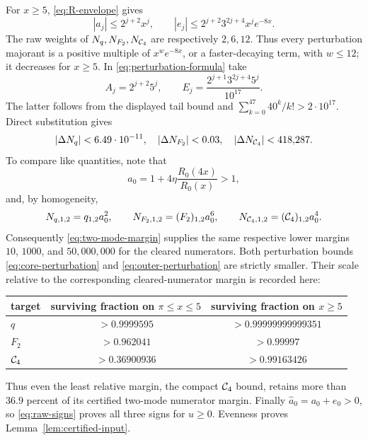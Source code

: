 For \(x\geq5\), \eqref{eq:R-envelope} gives
\[
 |a_j|\leq2^{j+2}x^j,\qquad
 |e_j|\leq2^{j+2}3^{2j+4}x^je^{-8x}.
\]
The raw weights of \(N_q,N_{F_2},N_{\mathcal{C}_4}\) are respectively \(2,6,12\).
Thus every perturbation majorant is a positive multiple of
\(x^we^{-8x}\), or a faster-decaying term, with \(w\leq12\); it decreases
for \(x\geq5\). In \eqref{eq:perturbation-formula} take
\[
 A_j=2^{j+2}5^j,\qquad
 E_j=\frac{2^{j+1}3^{2j+4}5^j}{10^{17}}.
\]
The latter follows from the displayed tail bound and
\(\sum_{k=0}^{47}40^k/k!>2\cdot10^{17}\). Direct substitution gives
\begin{equation}\label{eq:outer-perturbation}
 |\Delta N_q|<6.49\cdot10^{-11},\quad
 |\Delta N_{F_2}|<0.03,\quad
 |\Delta N_{\mathcal{C}_4}|<418{,}287.
\end{equation}
To compare like quantities, note that
\[
 a_0=1+4\eta\frac{R_0(4x)}{R_0(x)}>1,
\]
and, by homogeneity,
\[
 N_{q,1,2}=q_{1,2}a_0^2,\qquad
 N_{F_2,1,2}=(F_2)_{1,2}a_0^6,\qquad
 N_{\mathcal{C}_4,1,2}=(\mathcal{C}_4)_{1,2}a_0^4.
\]
Consequently \eqref{eq:two-mode-margin} supplies the same respective lower
margins \(10\), \(1000\), and \(50{,}000{,}000\) for the cleared
numerators.  Both perturbation bounds
\eqref{eq:core-perturbation} and \eqref{eq:outer-perturbation} are strictly
smaller. Their scale relative to the corresponding cleared-numerator margin
is recorded here:
\begin{center}
\small
\begin{tabular}{@{}lcc@{}}
\toprule
target & surviving fraction on \(\pi\leq x\leq5\)
       & surviving fraction on \(x\geq5\)\\
\midrule
\(q\) & \(>0.9999595\) & \(>0.99999999999351\)\\
\(F_2\) & \(>0.962041\) & \(>0.99997\)\\
\(\mathcal{C}_4\) & \(>0.36900936\) & \(>0.99163426\)\\
\bottomrule
\end{tabular}
\end{center}
Thus even the least relative margin, the compact \(\mathcal{C}_4\) bound, retains
more than \(36.9\) percent of its certified two-mode numerator margin.
Finally \(\widehat a_0=a_0+e_0>0\), so \eqref{eq:raw-signs} proves all three
signs for \(u\geq0\). Evenness proves Lemma~\ref{lem:certified-input}.
